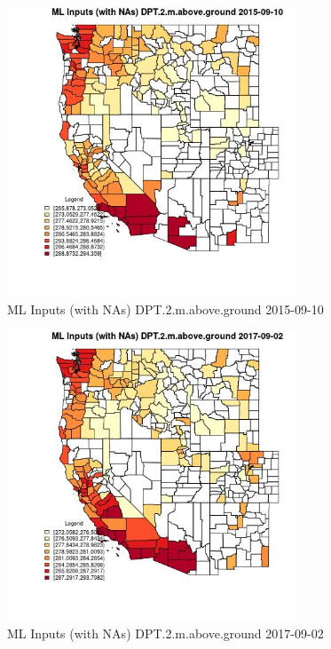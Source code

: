 \begin{figure} 
\centering  
\includegraphics[width=0.77\textwidth]{Code_Outputs/Report_ML_input_PM25_Step4_part_e_de_duplicated_aves_compiled_2019-05-21wNAs_CountyDPT2mabovegroundMean2015-09-10.jpg} 
\caption{\label{fig:Report_ML_input_PM25_Step4_part_e_de_duplicated_aves_compiled_2019-05-21wNAsCountyDPT2mabovegroundMean2015-09-10}ML Inputs (with NAs) DPT.2.m.above.ground 2015-09-10} 
\end{figure} 
 

\begin{figure} 
\centering  
\includegraphics[width=0.77\textwidth]{Code_Outputs/Report_ML_input_PM25_Step4_part_e_de_duplicated_aves_compiled_2019-05-21wNAs_CountyDPT2mabovegroundMean2017-09-02.jpg} 
\caption{\label{fig:Report_ML_input_PM25_Step4_part_e_de_duplicated_aves_compiled_2019-05-21wNAsCountyDPT2mabovegroundMean2017-09-02}ML Inputs (with NAs) DPT.2.m.above.ground 2017-09-02} 
\end{figure} 
 


